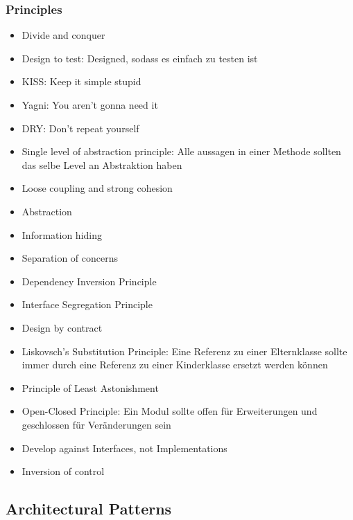 \subsubsection{Principles}
\begin{itemize}
	\item Divide and conquer
	\item Design to test: Designed, sodass es einfach zu testen ist
	\item KISS: Keep it simple stupid
	\item Yagni: You aren't gonna need it
	\item DRY: Don't repeat yourself
	\item Single level of abstraction principle: Alle aussagen in einer Methode sollten das selbe Level an Abstraktion haben
	\item Loose coupling and strong cohesion
	\item Abstraction
	\item Information hiding
	\item Separation of concerns
	\item Dependency Inversion Principle
	\item Interface Segregation Principle
	\item Design by contract
	\item Liskovsch's Substitution Principle: Eine Referenz zu einer Elternklasse sollte immer durch eine Referenz zu einer Kinderklasse ersetzt werden können
	\item Principle of Least Astonishment 
	\item Open-Closed Principle: Ein Modul sollte offen für Erweiterungen und geschlossen für Veränderungen sein
	\item Develop against Interfaces, not Implementations
	\item Inversion of control
\end{itemize}
\subsection{Architectural Patterns}
